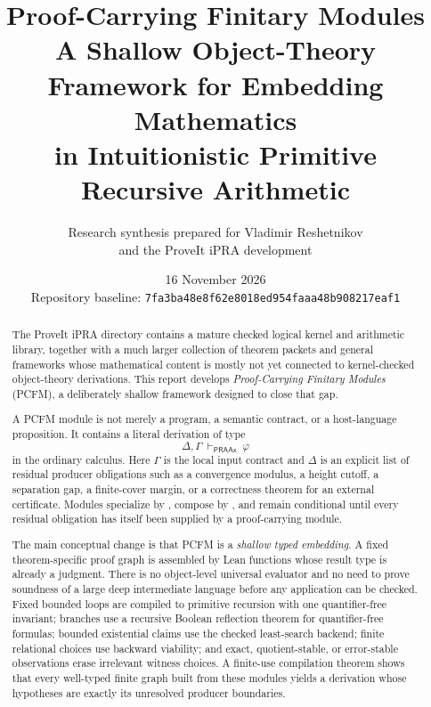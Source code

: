 \documentclass[11pt,oneside]{article}
\title{\textbf{Proof-Carrying Finitary Modules}\\[0.22em]
A Shallow Object-Theory Framework for Embedding Mathematics\\
in Intuitionistic Primitive Recursive Arithmetic}
\author{Research synthesis prepared for Vladimir Reshetnikov\\
and the ProveIt iPRA development}
\date{16 November 2026\\
Repository baseline: \texttt{7fa3ba48e8f62e8018ed954faaa48b908217eaf1}}
\theoremstyle{remark}
\newcommand{\PRAAx}{\mathsf{PRAAx}}
\newcommand{\code}[1]{\texttt{\detokenize{#1}}}
\begin{document}
\maketitle

\begin{abstract}
The ProveIt iPRA directory contains a mature checked logical kernel and arithmetic library, together with a much larger collection of theorem packets and general frameworks whose mathematical content is mostly not yet connected to kernel-checked object-theory derivations.  This report develops \emph{Proof-Carrying Finitary Modules} (PCFM), a deliberately shallow framework designed to close that gap.

A PCFM module is not merely a program, a semantic contract, or a host-language proposition.  It contains a literal derivation of type
\[
   \Delta,\Gamma\ \vdash_{\PRAAx}\ \varphi
\]
in the ordinary \code{Prf PRAAx} calculus.  Here $\Gamma$ is the local input contract and $\Delta$ is an explicit list of residual producer obligations such as a convergence modulus, a height cutoff, a separation gap, a finite-cover margin, or a correctness theorem for an external certificate.  Modules specialize by \code{Prf.subst}, compose by \code{Prf.trans}, and remain conditional until every residual obligation has itself been supplied by a proof-carrying module.

The main conceptual change is that PCFM is a \emph{shallow typed embedding}.  A fixed theorem-specific proof graph is assembled by Lean functions whose result type is already a \code{Prf PRAAx} judgment.  There is no object-level universal evaluator and no need to prove soundness of a large deep intermediate language before any application can be checked.  Fixed bounded loops are compiled to primitive recursion with one quantifier-free invariant; branches use a recursive Boolean reflection theorem for quantifier-free formulas; bounded existential claims use the checked least-search backend; finite relational choices use backward viability; and exact, quotient-stable, or error-stable observations erase irrelevant witness choices.  A finite-use compilation theorem shows that every well-typed finite graph built from these modules yields a derivation whose hypotheses are exactly its unresolved producer boundaries.


\end{abstract}
\end{document}
